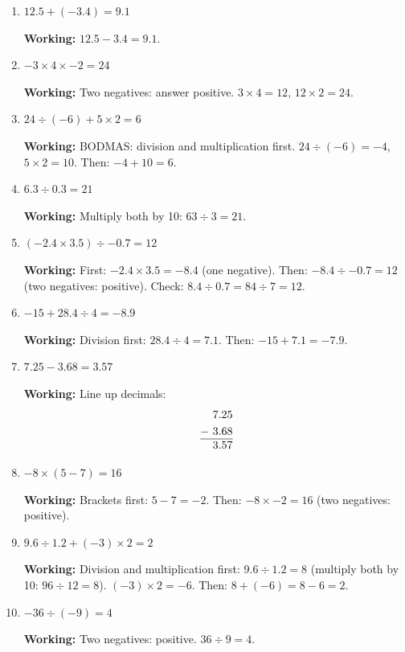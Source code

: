 \documentclass[12pt,a4paper]{article}
\begin{document}
\begin{enumerate}
    \item $12.5 + (-3.4) = 9.1$
    
    \textbf{Working:} $12.5 - 3.4 = 9.1$.
    
    \item $-3 \times 4 \times -2 = 24$
    
    \textbf{Working:} Two negatives: answer positive.
    $3 \times 4 = 12$, $12 \times 2 = 24$.
    
    \item $24 \div (-6) + 5 \times 2 = 6$
    
    \textbf{Working:} BODMAS: division and multiplication first.
    $24 \div (-6) = -4$, $5 \times 2 = 10$.
    Then: $-4 + 10 = 6$.
    
    \item $6.3 \div 0.3 = 21$
    
    \textbf{Working:} Multiply both by 10: $63 \div 3 = 21$.
    
    \item $(-2.4 \times 3.5) \div -0.7 = 12$
    
    \textbf{Working:} First: $-2.4 \times 3.5 = -8.4$ (one negative).
    Then: $-8.4 \div -0.7 = 12$ (two negatives: positive).
    Check: $8.4 \div 0.7 = 84 \div 7 = 12$.
    
    \item $-15 + 28.4 \div 4 = -8.9$
    
    \textbf{Working:} Division first: $28.4 \div 4 = 7.1$.
    Then: $-15 + 7.1 = -7.9$.
    
    \item $7.25 - 3.68 = 3.57$
    
    \textbf{Working:} Line up decimals:
    \begin{align*}
        &\ 7.25 \\
        -&\ 3.68 \\
        \hline
        &\ 3.57
    \end{align*}
    
    \item $-8 \times (5 - 7) = 16$
    
    \textbf{Working:} Brackets first: $5 - 7 = -2$.
    Then: $-8 \times -2 = 16$ (two negatives: positive).
    
    \item $9.6 \div 1.2 + (-3) \times 2 = 2$
    
    \textbf{Working:} Division and multiplication first:
    $9.6 \div 1.2 = 8$ (multiply both by 10: $96 \div 12 = 8$).
    $(-3) \times 2 = -6$.
    Then: $8 + (-6) = 8 - 6 = 2$.
    
    \item $-36 \div (-9) = 4$
    
    \textbf{Working:} Two negatives: positive. $36 \div 9 = 4$.
\end{enumerate}
\end{document}

